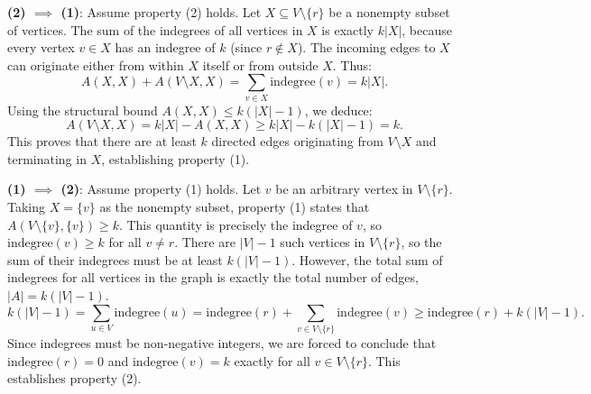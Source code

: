 \documentclass{article}
\begin{document}
\begin{enumerate}[label=\fbox{\arabic*}]
        \textbf{(2) $\implies$ (1)}:
        Assume property (2) holds. Let $X \subseteq V \setminus \{r\}$ be a nonempty subset of vertices.
        The sum of the indegrees of all vertices in $X$ is exactly $k|X|$, because every vertex $v \in X$ has an indegree of $k$ (since $r \notin X$).
        The incoming edges to $X$ can originate either from within $X$ itself or from outside $X$. Thus:
        \[
          A(X, X) + A(V \setminus X, X) = \sum_{v \in X} \text{indegree}(v) = k|X|.
        \]
        Using the structural bound $A(X, X) \le k(|X|-1)$, we deduce:
        \[
          A(V \setminus X, X) = k|X| - A(X, X) \ge k|X| - k(|X|-1) = k.
        \]
        This proves that there are at least $k$ directed edges originating from $V \setminus X$ and terminating in $X$, establishing property (1).

        \textbf{(1) $\implies$ (2)}:
        Assume property (1) holds. Let $v$ be an arbitrary vertex in $V \setminus \{r\}$.
        Taking $X = \{v\}$ as the nonempty subset, property (1) states that $A(V \setminus \{v\}, \{v\}) \ge k$.
        This quantity is precisely the indegree of $v$, so $\text{indegree}(v) \ge k$ for all $v \neq r$.
        There are $|V|-1$ such vertices in $V \setminus \{r\}$, so the sum of their indegrees must be at least $k(|V|-1)$.
        However, the total sum of indegrees for all vertices in the graph is exactly the total number of edges, $|A| = k(|V|-1)$.
        \[
          k(|V|-1) = \sum_{u \in V} \text{indegree}(u) = \text{indegree}(r) + \sum_{v \in V \setminus \{r\}} \text{indegree}(v) \ge \text{indegree}(r) + k(|V|-1).
        \]
        Since indegrees must be non-negative integers, we are forced to conclude that $\text{indegree}(r) = 0$ and $\text{indegree}(v) = k$ exactly for all $v \in V \setminus \{r\}$. This establishes property (2).


\end{enumerate}
\end{document}
